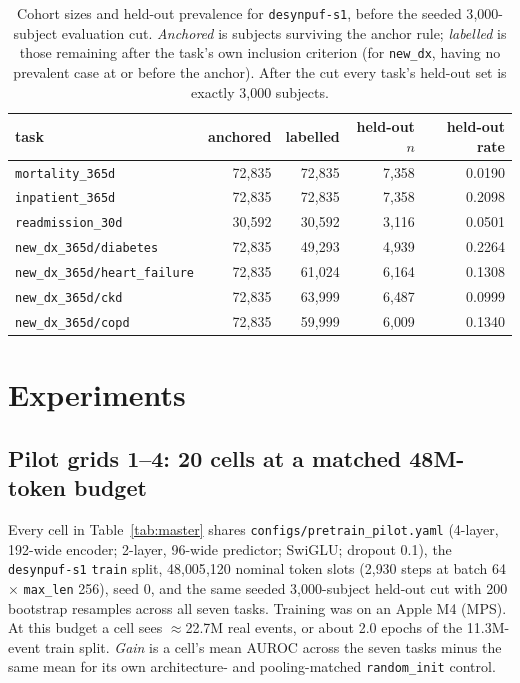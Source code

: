 \documentclass[11pt,a4paper]{article}
\newcommand{\code}[1]{\texttt{\small #1}}
\begin{document}
\begin{table}[t]
\centering\small
\caption{Cohort sizes and held-out prevalence for \code{desynpuf-s1}, before the
seeded 3{,}000-subject evaluation cut. \emph{Anchored} is subjects surviving the
anchor rule; \emph{labelled} is those remaining after the task's own inclusion
criterion (for \code{new\_dx}, having no prevalent case at or before the
anchor). After the cut every task's held-out set is exactly 3{,}000 subjects.}
\label{tab:cohorts}
\begin{tabular}{lrrrr}
\toprule
task & anchored & labelled & held-out $n$ & held-out rate \\
\midrule
\code{mortality\_365d}              & 72{,}835 & 72{,}835 & 7{,}358 & 0.0190 \\
\code{inpatient\_365d}              & 72{,}835 & 72{,}835 & 7{,}358 & 0.2098 \\
\code{readmission\_30d}             & 30{,}592 & 30{,}592 & 3{,}116 & 0.0501 \\
\code{new\_dx\_365d/diabetes}       & 72{,}835 & 49{,}293 & 4{,}939 & 0.2264 \\
\code{new\_dx\_365d/heart\_failure} & 72{,}835 & 61{,}024 & 6{,}164 & 0.1308 \\
\code{new\_dx\_365d/ckd}            & 72{,}835 & 63{,}999 & 6{,}487 & 0.0999 \\
\code{new\_dx\_365d/copd}           & 72{,}835 & 59{,}999 & 6{,}009 & 0.1340 \\
\bottomrule
\end{tabular}
\end{table}

\section{Experiments}
\label{sec:experiments}

\subsection{Pilot grids 1--4: 20 cells at a matched 48M-token budget}

Every cell in Table~\ref{tab:master} shares \code{configs/pretrain\_pilot.yaml}
(4-layer, 192-wide encoder; 2-layer, 96-wide predictor; SwiGLU; dropout 0.1),
the \code{desynpuf-s1} \code{train} split, 48{,}005{,}120 nominal token slots
(2{,}930 steps at batch 64 $\times$ \code{max\_len} 256), seed 0, and the same
seeded 3{,}000-subject held-out cut with 200 bootstrap resamples across all
seven tasks. Training was on an Apple M4 (MPS). At this budget a cell sees
$\approx$22.7M real events, or about 2.0 epochs of the 11.3M-event train split.
\emph{Gain} is a cell's mean AUROC across the seven tasks minus the same mean
for its own architecture- and pooling-matched \code{random\_init} control.
\end{document}
